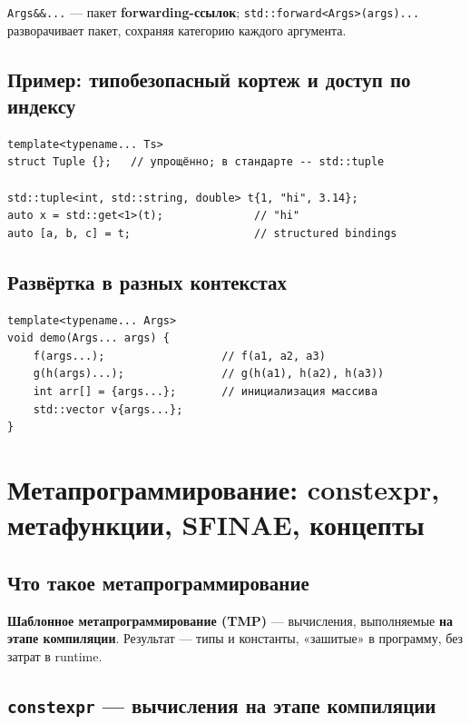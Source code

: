 \texttt{Args\&\&...} --- пакет \textbf{forwarding-ссылок};
\texttt{std::forward<Args>(args)...} разворачивает пакет, сохраняя категорию
каждого аргумента.

\subsection{Пример: типобезопасный кортеж и доступ по индексу}

\begin{lstlisting}
template<typename... Ts>
struct Tuple {};   // упрощённо; в стандарте -- std::tuple

std::tuple<int, std::string, double> t{1, "hi", 3.14};
auto x = std::get<1>(t);              // "hi"
auto [a, b, c] = t;                   // structured bindings
\end{lstlisting}

\subsection{Развёртка в разных контекстах}

\begin{lstlisting}
template<typename... Args>
void demo(Args... args) {
    f(args...);                  // f(a1, a2, a3)
    g(h(args)...);               // g(h(a1), h(a2), h(a3))
    int arr[] = {args...};       // инициализация массива
    std::vector v{args...};
}
\end{lstlisting}


\section{Метапрограммирование: constexpr, метафункции, SFINAE, концепты}

\subsection{Что такое метапрограммирование}

\textbf{Шаблонное метапрограммирование (TMP)} --- вычисления, выполняемые
\textbf{на этапе компиляции}. Результат --- типы и константы, «зашитые» в
программу, без затрат в runtime.

\subsection{\texttt{constexpr} --- вычисления на этапе компиляции}

